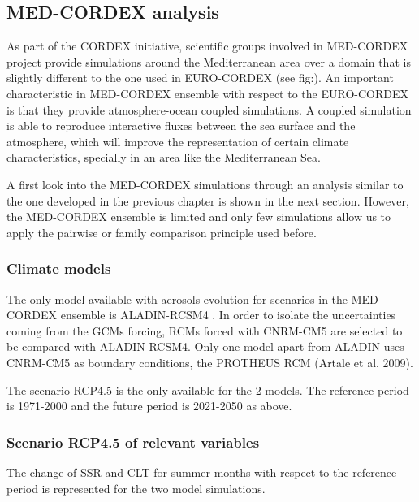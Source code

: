 \begin{subappendices}
\subsection{MED-CORDEX analysis}

As part of the CORDEX initiative, scientific groups involved in MED-CORDEX \cite*{Ruti2016} project provide simulations around the Mediterranean area over a domain that is slightly different to the one used in EURO-CORDEX (see fig:). An important characteristic in MED-CORDEX ensemble with respect to the EURO-CORDEX is that they provide atmosphere-ocean coupled simulations. A coupled simulation is able to reproduce interactive fluxes between the sea surface and the atmosphere, which will improve the representation of certain climate characteristics, specially in an area like the Mediterranean Sea.

A first look into the MED-CORDEX simulations through an analysis  similar to the one developed in the previous chapter is shown in the next section. However, the MED-CORDEX ensemble is limited and only few simulations allow us to apply the pairwise or family comparison principle used before.

\subsubsection{Climate models}

The only model available with aerosols evolution for scenarios in the MED-CORDEX ensemble is ALADIN-RCSM4 \cite*{Sevault2014}. In order to isolate the uncertainties coming from the GCMs forcing, RCMs forced with CNRM-CM5 are selected to be compared with ALADIN RCSM4. Only one model apart from ALADIN uses CNRM-CM5 as boundary conditions, the PROTHEUS RCM (Artale et al. 2009).

The scenario RCP4.5 is the only available for the 2 models. The reference period is 1971-2000 and the future period is 2021-2050 as above.

\subsubsection{Scenario RCP4.5 of relevant variables}

The change of SSR and CLT for summer months with respect to the reference period is represented for the two model simulations.


\end{subappendices}

